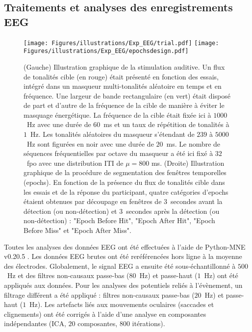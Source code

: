 \subsection{Traitements et analyses des enregistrements EEG}
\label{etude2traitementetanalysesEEG}

\begin{figure*}[!t]
\centering
\texttt{[image: Figures/illustrations/Exp\_EEG/trial.pdf]}
\texttt{[image: Figures/illustrations/Exp\_EEG/epochsdesign.pdf]}
\caption[Illustration graphique d'un essai de stimulus et du design de segmentation des epochs]{(Gauche) Illustration graphique de la stimulation auditive. Un flux de tonalités cible (en rouge) était présenté en fonction des essais, intégré dans un masqueur multi-tonalités aléatoire en temps et en fréquence. Une largeur de bande rectangulaire (en vert) était disposé de part et d'autre de la fréquence de la cible de manière à éviter le masquage énergétique. La fréquence de la cible était fixée ici à $1000$~Hz avec une durée de $60$~ms et un taux de répétition de tonalités à $1$~Hz. Les tonalités aléatoires du masqueur s'étendant de $239$ à $5000$~Hz sont figurées en noir avec une durée de $20$~ms. Le nombre de séquences fréquentielles par octave du masqueur a été ici fixé à $32$~fpo avec une distribution ITI de $\mu = 800$ ms. (Droite) Illustration graphique de la procédure de segmentation des fenêtres temporelles (epochs). En fonction de la présence du flux de tonalités cible dans les essais et de la réponse du participant, quatre catégories d'epochs étaient obtenues par découpage en fenêtres de $3$~secondes avant la détection (ou non-détection) et $3$~secondes après la détection (ou non-détection) : "Epoch Before Hit", "Epoch After Hit", "Epoch Before Miss" et "Epoch After Miss".}
\label{fig:figure5segmentationepochs}
\end{figure*}

Toutes les analyses des données EEG ont été effectuées à l'aide de Python-MNE v0.20.5 \citep{gramfort2013meg}. 
Les données EEG brutes ont été reréférencées hors ligne à la moyenne des électrodes. 
Globalement, le signal EEG a ensuite été sous-échantillonné à $500$~Hz et des filtres non-causaux passe-bas ($80$~Hz) et passe-haut ($1$~Hz) ont été appliqués aux données. 
Pour les analyses des potentiels reliés à l'évènement, un filtrage différent a été appliqué : filtres non-causaux passe-bas ($20$~Hz) et passe-haut ($1$~Hz).
Les artefacts liés aux mouvements oculaires (saccades et clignements) ont été corrigés à l'aide d'une analyse en composantes indépendantes (ICA, $20$ composantes, $800$ itérations). 

